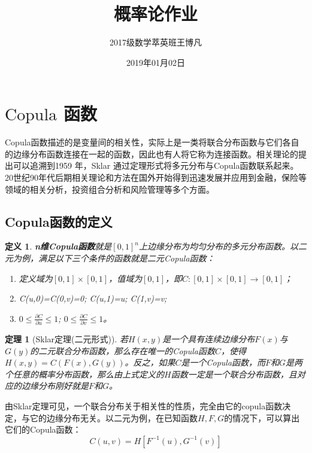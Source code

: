 \documentclass[UTF-8]{ctexart}
\author{2017级数学萃英班王博凡}
\title{概率论作业}
\date{2019年01月02日}
\newtheorem{theorem}{\hspace{2em}\textbf{定理}}[section]
\newtheorem{definition}{\hspace{2em}\textbf{定义}}[section]
\begin{document}
\maketitle
\newpage
\tableofcontents
\newpage
{}

\section{$\mathrm{Copula}$ 函数}

Copula函数描述的是变量间的相关性，实际上是一类将联合分布函数与它们各自的边缘分布函数连接在一起的函数，因此也有人将它称为连接函数。相关理论的提出可以追溯到1959 年，Sklar 通过定理形式将多元分布与Copula函数联系起来。20世纪90年代后期相关理论和方法在国外开始得到迅速发展并应用到金融，保险等领域的相关分析，投资组合分析和风险管理等多个方面。

\subsection{Copula函数的定义}

\begin{definition}
    \textbf{n维Copula函数}就是$[0,1]^{n}$上边缘分布为均匀分布的多元分布函数。以二元为例，满足以下三个条件的函数就是二元Copula函数：
	\begin{enumerate}[$(1)$]
        \item 定义域为$[0,1]\times[0,1]$，值域为$[0,1]$，即$C:[0,1]\times[0,1]\rightarrow[0,1]$；
        \item C(u,0)=C(0,v)=0; C(u,1)=u; C(1,v)=v; 
        \item$0\leqslant\frac{\partial C}{\partial u}\leqslant1$; $0\leqslant\frac{\partial C}{\partial v}\leqslant1$。
    \end{enumerate}
\end{definition}

\begin{theorem}[Sklar定理(二元形式)]
    若$H(x,y)$是一个具有连续边缘分布$F(x)$与$G(y)$的二元联合分布函数，那么存在唯一的Copula函数$C$，使得$H(x,y)=C(F(x),G(y))$。反之，如果$C$是一个Copula函数，而$F$和$G$是两个任意的概率分布函数，那么由上式定义的$H$函数一定是一个联合分布函数，且对应的边缘分布刚好就是$F$和$G$。
\end{theorem}

由Sklar定理可见，一个联合分布关于相关性的性质，完全由它的copula函数决定，与它的边缘分布无关。以二元为例，在已知函数$H,F,G$的情况下，可以算出它们的Copula函数：
\[
    C(u,v)=H[F^{-1}(u),G^{-1}(v)]
\]
\end{document}
